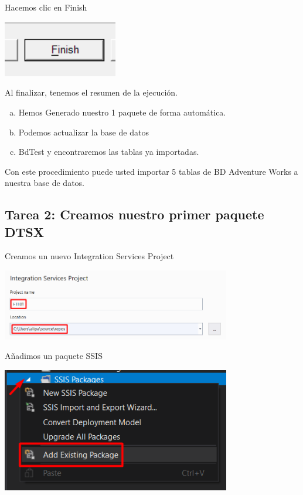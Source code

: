 \documentclass[12pt,letterpaper]{article}
\begin{document}
Hacemos clic en Finish

\begin{center}
    \includegraphics[width=5cm]{./img/img8.png}
\end{center}

Al finalizar, tenemos el resumen de la ejecución.

\begin{enumerate}[a. ]
    \item Hemos Generado nuestro 1 paquete de forma automática.
    \item Podemos actualizar la base de datos
    \item BdTest y encontraremos las tablas ya importadas.
\end{enumerate}

Con este procedimiento puede usted importar 5 tablas de BD Adventure Works a nuestra base de datos.

\subsection{Tarea 2: Creamos nuestro primer paquete DTSX}

Creamos un nuevo Integration Services Project

\begin{center}
    \includegraphics[width=10cm]{./img/img9.png}
\end{center}

Añadimos un paquete SSIS

\begin{center}
    \includegraphics[width=10cm]{./img/img10.png}
\end{center}
\end{document}
